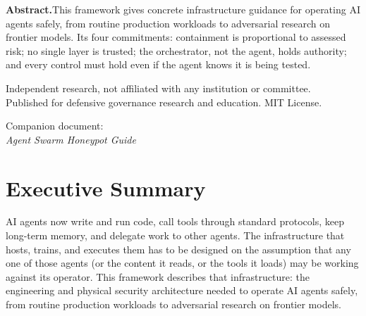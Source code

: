 \documentclass[11pt,letterpaper]{article}
\begin{document}
\begin{titlepage}
\begin{tcolorbox}[enhanced, colback=lightgray, colframe=slategraphite, boxrule=0pt, leftrule=4pt, arc=0pt, outer arc=0pt, left=14pt, right=14pt, top=10pt, bottom=10pt]
\small
\textbf{\color{slategraphite}Abstract.}\enspace This framework gives concrete infrastructure guidance for operating AI agents safely, from routine production workloads to adversarial research on frontier models. Its four commitments: containment is proportional to assessed risk; no single layer is trusted; the orchestrator, not the agent, holds authority; and every control must hold even if the agent knows it is being tested.
\end{tcolorbox}

\vfill

{\footnotesize\color{softslate}\sffamily
\noindent\begin{minipage}[b]{0.62\textwidth}
Independent research, not affiliated with any institution or committee.\\
Published for defensive governance research and education. MIT License.
\end{minipage}\hfill
\begin{minipage}[b]{0.35\textwidth}\raggedleft
Companion document:\\
\emph{Agent Swarm Honeypot Guide}
\end{minipage}}

\end{titlepage}

\begingroup
\renewcommand{\contentsname}{Contents}
\tableofcontents
\endgroup
\vspace{1.5em}
\begingroup
\renewcommand{\listfigurename}{List of Figures}
\listoffigures
\endgroup
\clearpage

\section{Executive Summary}

AI agents now write and run code, call tools through standard protocols, keep long-term memory, and delegate work to other agents. The infrastructure that hosts, trains, and executes them has to be designed on the assumption that any one of those agents (or the content it reads, or the tools it loads) may be working against its operator. This framework describes that infrastructure: the engineering and physical security architecture needed to operate AI agents safely, from routine production workloads to adversarial research on frontier models.
\end{document}
